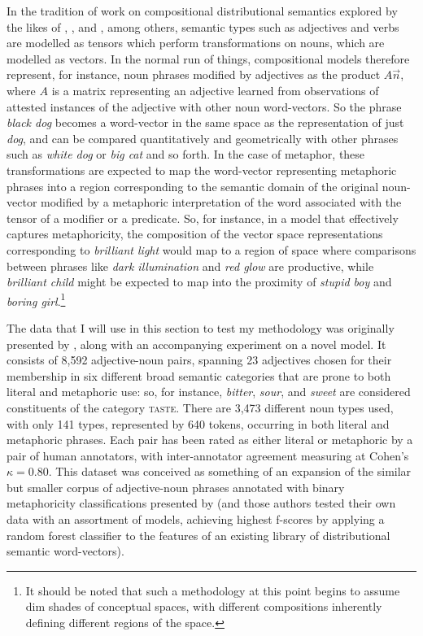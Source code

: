 In the tradition of work on compositional distributional semantics explored by the likes of \cite{MitchellEA2010}, \cite{BaroniEA2010}, and \cite{CoeckeEA2011}, among others, semantic types such as adjectives and verbs are modelled as tensors which perform transformations on nouns, which are modelled as vectors.  In the normal run of things, compositional models therefore represent, for instance, noun phrases modified by adjectives as the product $A\overrightarrow{n}$, where $A$ is a matrix representing an adjective learned from observations of attested instances of the adjective with other noun word-vectors.  So the phrase \emph{black dog} becomes a word-vector in the same space as the representation of just \emph{dog}, and can be compared quantitatively and geometrically with other phrases such as \emph{white dog} or \emph{big cat} and so forth.  In the case of metaphor, these transformations are expected to map the word-vector representing metaphoric phrases into a region corresponding to the semantic domain of the original noun-vector modified by a metaphoric interpretation of the word associated with the tensor of a modifier or a predicate.  So, for instance, in a model that effectively captures metaphoricity, the composition of the vector space representations corresponding to \emph{brilliant light} would map to a region of space where comparisons between phrases like \emph{dark illumination} and \emph{red glow} are productive, while \emph{brilliant child} might be expected to map into the proximity of \emph{stupid boy} and \emph{boring girl}.\footnote{It should be noted that such a methodology at this point begins to assume dim shades of  conceptual spaces, with different compositions inherently defining different regions of the space.}

The data that I will use in this section to test my methodology was originally presented by \cite{GutierrezEA2016}, along with an accompanying experiment on a novel model.  It consists of 8,592 adjective-noun pairs, spanning 23 adjectives chosen for their membership in six different broad semantic categories that are prone to both literal and metaphoric use: so, for instance, \emph{bitter}, \emph{sour}, and \emph{sweet} are considered constituents of the category \textsc{taste}.  There are 3,473 different noun types used, with only 141 types, represented by 640 tokens, occurring in both literal and metaphoric phrases.  Each pair has been rated as either literal or metaphoric by a pair of human annotators, with inter-annotator agreement measuring at Cohen's $\kappa = 0.80$.  This dataset was conceived as something of an expansion of the similar but smaller corpus of adjective-noun phrases annotated with binary metaphoricity classifications presented by \cite{TsvetkovEA2014} (and those authors tested their own data with an assortment of models, achieving highest f-scores by applying a random forest classifier to the features of an existing library of distributional semantic word-vectors).

